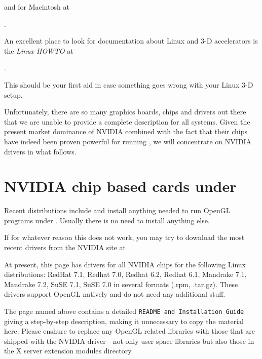  \medskip

 \noindent
 and for Macintosh at
  \medskip

.
 \medskip

 \noindent
An excellent place to look for documentation about Linux and 3-D accelerators is the {\it
Linux  HOWTO} at
 \medskip

.
 \medskip

\noindent
 This should be your first aid in case something goes wrong with your Linux 3-D setup.

Unfortunately, there are so many graphics boards, chips and drivers out there that we are
unable to provide a complete description for all systems. Given the present market
dominance of NVIDIA combined with the fact that their chips have indeed been proven
powerful for running \FlightGear{}$\!$, we will concentrate on NVIDIA
drivers in what follows.

\section{NVIDIA chip based cards under \label{nvidialinux}}
Recent  distributions include and install anything needed to run OpenGL
programs under . Usually there is no need to install anything else.

If for whatever reason this does not work, you may try to download the most recent
drivers from the NVIDIA site at
 \medskip

 \medskip

 \noindent
At present, this page has drivers for all NVIDIA chips for the following Linux
distributions: RedHat 7.1, Redhat 7.0, Redhat 6.2, Redhat
6.1, Mandrake 7.1, Mandrake 7.2, SuSE 7.1, SuSE 7.0 in several formats (.rpm, .tar.gz).
These drivers support OpenGL natively and do not need any additional stuff.

The page named above contains a detailed \texttt{README and Installation Guide} giving a
step-by-step description, making it unnecessary to copy the material here.
Please enshure to replace any OpenGL related libraries with those that are
shipped with the NVIDIA driver - not only user space libraries but also
those in the X server extension modules directory.

